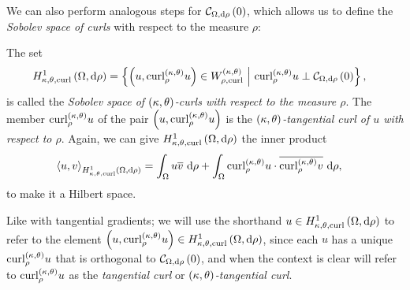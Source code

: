 We can also perform analogous steps for $\curlZero{\ddom}{\rho}$, which allows us to define the \emph{Sobolev space of curls} with respect to the measure $\rho$:
\begin{definition} \label{def:CurlSobSpace}
	The set
	\begin{align*}
		\ktcurlSob{\ddom}{\rho} &= \clbracs{ \bracs{u, \ktcurl{\rho}u}\in W^{\kt}_{\rho,\mathrm{curl}} \setVert \ktcurl{\rho}u \perp \curlZero{\ddom}{\rho} },
	\end{align*}
	is called the \emph{Sobolev space of $\kt$-curls with respect to the measure $\rho$}.
	The member $\ktcurl{\rho}u$ of the pair $\bracs{u, \ktcurl{\rho}u}$ is the \emph{$\kt$-tangential curl of $u$ with respect to $\rho$}.
	Again, we can give $\ktcurlSob{\ddom}{\rho}$ the inner product
	\begin{align*}
		\ip{u}{v}_{\ktcurlSob{\ddom}{\rho}} 
		&= \integral{\ddom}{u\overline{v}}{\rho}
		+ \integral{\ddom}{\ktcurl{\rho}u \cdot \overline{\ktcurl{\rho}v}}{\rho},
	\end{align*}
	to make it a Hilbert space.
\end{definition}
Like with tangential gradients; we will use the shorthand $u\in\ktcurlSob{\ddom}{\rho}$ to refer to the element $\bracs{u, \ktcurl{\rho}u}\in\ktcurlSob{\ddom}{\rho}$, since each $u$ has a unique $\ktcurl{\rho}u$ that is orthogonal to $\curlZero{\ddom}{\rho}$, and when the context is clear will refer to $\ktcurl{\rho}u$ as the \emph{tangential curl} or \emph{$\kt$-tangential curl}.

